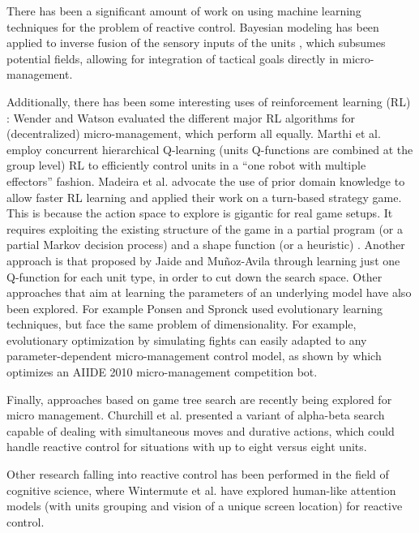 \documentclass[journal]{IEEEtran}
\begin{document}
There has been a significant amount of work on using machine learning techniques for the problem of reactive control. Bayesian modeling has been applied to inverse fusion of the sensory inputs of the units \cite{SynnaeveMicroCig11}, which subsumes potential fields, allowing for integration of tactical goals directly in micro-management. 

Additionally, there has been some interesting uses of reinforcement learning (RL) \cite{Sutton}: 
Wender and Watson \cite{WenderRL} evaluated the different major RL algorithms for (decentralized) micro-management, which perform all equally. Marthi et al. \cite{Marthi05} employ concurrent hierarchical Q-learning (units Q-functions are combined at the group level) RL to efficiently control units in a ``one robot with multiple effectors'' fashion. Madeira et al. \cite{Madeira06} advocate the use of prior domain knowledge to allow faster RL learning and applied their work on a turn-based strategy game. This is because the action space to explore is gigantic for real game setups. It requires exploiting the existing structure of the game in a partial program (or a partial Markov decision process) and a shape function (or a heuristic) \cite{Marthi05}. Another approach is that proposed by Jaide and Mu{\~n}oz-Avila \cite{jaidee2012classq} through learning just one Q-function for each unit type, in order to cut down the search space. Other approaches that aim at learning the parameters of an underlying model have also been explored. For example Ponsen and Spronck \cite{GA} used evolutionary learning techniques, but face the same problem of dimensionality. For example, evolutionary optimization by simulating fights can easily adapted to any parameter-dependent micro-management control model, as shown by \cite{OthmanSimu} which optimizes an AIIDE 2010 micro-management competition bot.

Finally, approaches based on game tree search are recently being explored for micro management. Churchill et al. \cite{churchill2012AIIDE} presented a variant of alpha-beta search capable of dealing with simultaneous moves and durative actions, which could handle reactive control for situations with up to eight versus eight units. 

Other research falling into reactive control has been performed in the field of cognitive science, where Wintermute et al. \cite{SORTS} have explored human-like attention models (with units grouping and vision of a unique screen location) for reactive control.
\end{document}
